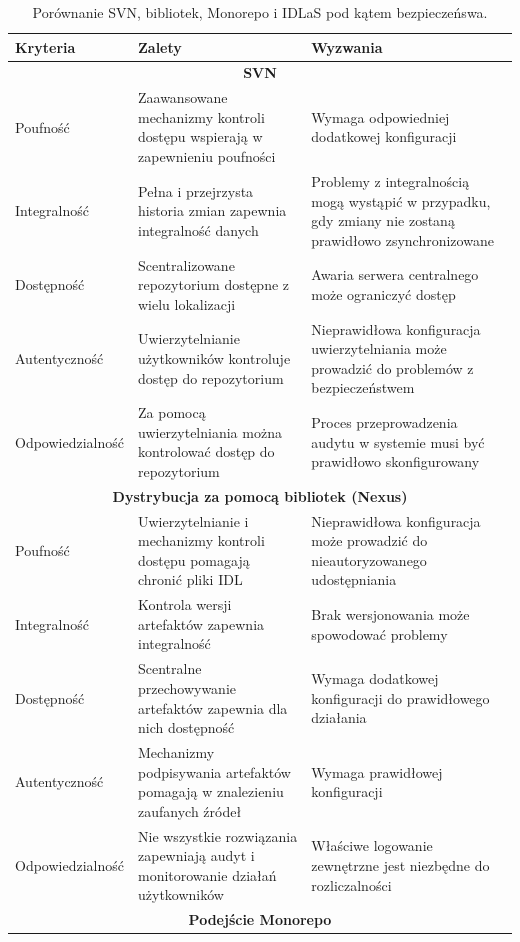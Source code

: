 \documentclass[runningheads,12pt]{llncs}
\begin{document}
\begin{longtable}{|p{4cm}|p{4cm}|p{4cm}|}
    \caption{Porównanie SVN, bibliotek, Monorepo i IDLaS pod kątem bezpieczeńswa.} \\
    \hline
    \textbf{Kryteria} & \textbf{Zalety} & \textbf{Wyzwania} \\ \hline
    \multicolumn{3}{|c|}{\textbf{SVN }} \\ \hline
    Poufność & Zaawansowane mechanizmy kontroli dostępu wspierają w zapewnieniu poufności & Wymaga odpowiedniej dodatkowej konfiguracji \\ \hline
    Integralność & Pełna i przejrzysta historia zmian zapewnia integralność danych & Problemy z integralnością mogą wystąpić w przypadku, gdy zmiany nie zostaną prawidłowo zsynchronizowane \\ \hline
    Dostępność & Scentralizowane repozytorium dostępne z wielu lokalizacji & Awaria serwera centralnego może ograniczyć dostęp \\ \hline
    Autentyczność & Uwierzytelnianie użytkowników kontroluje dostęp do repozytorium & Nieprawidłowa konfiguracja uwierzytelniania może prowadzić do problemów z bezpieczeństwem \\ \hline
    Odpowiedzialność & Za pomocą uwierzytelniania można kontrolować dostęp do repozytorium & Proces przeprowadzenia audytu w systemie musi być prawidłowo skonfigurowany \\ \hline
    \multicolumn{3}{|c|}{\textbf{Dystrybucja za pomocą bibliotek (Nexus)}} \\ \hline
    Poufność & Uwierzytelnianie i mechanizmy kontroli dostępu pomagają chronić pliki IDL & Nieprawidłowa konfiguracja może prowadzić do nieautoryzowanego udostępniania \\ \hline
    Integralność & Kontrola wersji artefaktów zapewnia integralność & Brak wersjonowania może spowodować problemy \\ \hline
    Dostępność & Scentralne przechowywanie artefaktów zapewnia dla nich dostępność & Wymaga dodatkowej konfiguracji do prawidłowego działania \\ \hline
    Autentyczność & Mechanizmy podpisywania artefaktów pomagają w znalezieniu zaufanych źródeł & Wymaga prawidłowej konfiguracji \\ \hline
    Odpowiedzialność & Nie wszystkie rozwiązania zapewniają audyt i monitorowanie działań użytkowników & Właściwe logowanie zewnętrzne jest niezbędne do rozliczalności \\ \hline
    \multicolumn{3}{|c|}{\textbf{Podejście Monorepo}} \\ \hline

\end{longtable}
\end{document}
